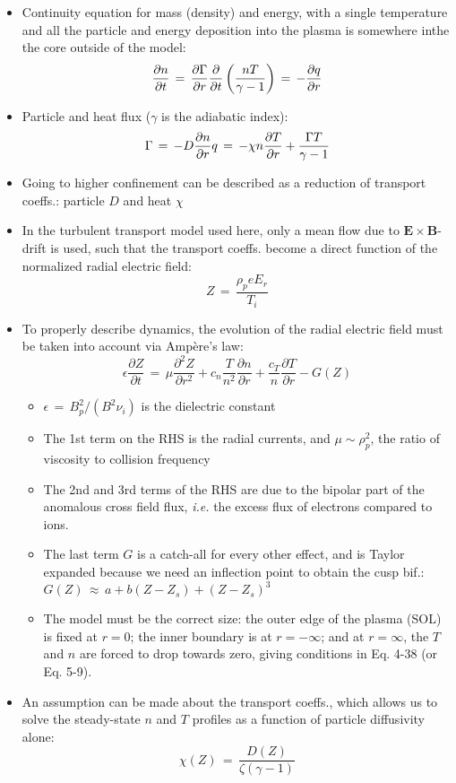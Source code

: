 \documentclass[a4paper]{article}
\begin{document}
\begin{itemize}
\item
  Continuity equation for mass (density) and energy, with a single
  temperature and all the particle and energy deposition into the plasma
  is somewhere inthe the core outside of the model:
  \[\frac{\partial n}{\partial t} \,=\, \frac{\partial \Gamma}{\partial r} \\ \frac{\partial}{\partial t} \left(\frac{nT}{\gamma - 1}\right) \,=\, -\frac{\partial q}{\partial r}\]
\item
  Particle and heat flux ($\gamma$ is the adiabatic index):
  \[\Gamma \,=\, -D \frac{\partial n}{\partial r} \\ q \,=\, -\chi n \frac{\partial T}{\partial r} + \frac{\Gamma T}{\gamma - 1}\]
\item
  Going to higher confinement can be described as a reduction of
  transport coeffs.: particle $D$ and heat $\chi$
\item
  In the turbulent transport model used here, only a mean flow due to
  $\mathbf{E}\times\mathbf{B}$-drift is used, such that the transport
  coeffs. become a direct function of the normalized radial electric
  field: \[Z \,=\, \frac{\rho_p e E_r}{T_i}\]
\item
  To properly describe dynamics, the evolution of the radial electric
  field must be taken into account via Ampère's law:
  \[\epsilon \frac{\partial Z}{\partial t} \,=\, \mu \frac{\partial^2 Z}{\partial r^2} + c_n \frac{T}{n^2} \frac{\partial n}{\partial r} + \frac{c_T}{n} \frac{\partial T}{\partial r} - G(Z)\]

  \begin{itemize}
  \item
    $\epsilon \,=\, B_p^2 / (B^2 \nu_i)$ is the dielectric constant
  \item
    The 1st term on the RHS is the radial currents, and
    $\mu \sim \rho_p^2$, the ratio of viscosity to collision frequency
  \item
    The 2nd and 3rd terms of the RHS are due to the bipolar part of the
    anomalous cross field flux, \emph{i.e.} the excess flux of electrons
    compared to ions.
  \item
    The last term $G$ is a catch-all for every other effect, and is
    Taylor expanded because we need an inflection point to obtain the
    cusp bif.: $G(Z) \,\approx\, a + b(Z - Z_s) + (Z - Z_s)^3$
  \item
    The model must be the correct size: the outer edge of the plasma
    (SOL) is fixed at $r = 0$; the inner boundary is at $r = -\infty$;
    and at $r = \infty$, the $T$ and $n$ are forced to drop towards
    zero, giving conditions in Eq. 4-38 (or Eq. 5-9).
  \end{itemize}
\item
  An assumption can be made about the transport coeffs., which allows us
  to solve the steady-state $n$ and $T$ profiles as a function of
  particle diffusivity alone:
  \[\chi(Z) \,=\, \frac{D(Z)}{\zeta(\gamma - 1)}\]


\end{itemize}
\end{document}
